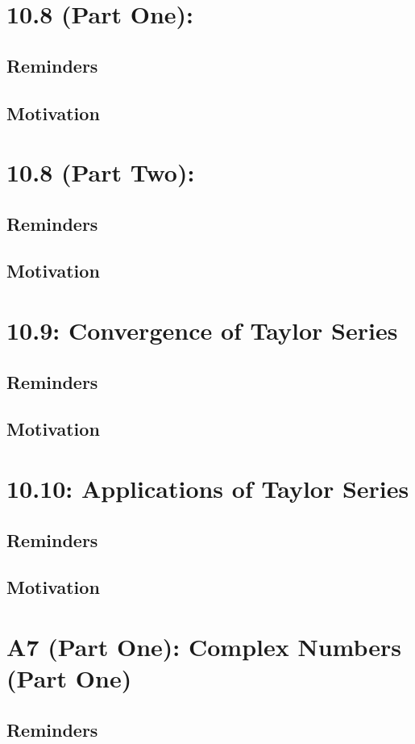 \documentclass{report}
\begin{document}
\begin{sloppypar}
\chapter{10.8 (Part One):}
\section{Reminders}
\section{Motivation}
\chapter{10.8 (Part Two):}
\section{Reminders}
\section{Motivation}
\chapter{10.9: Convergence of Taylor Series}
\section{Reminders}
\section{Motivation}
\chapter{10.10: Applications of Taylor Series}
\section{Reminders}
\section{Motivation}
\chapter{A7 (Part One): Complex Numbers (Part One)}
\section{Reminders}

\end{sloppypar}
\end{document}
